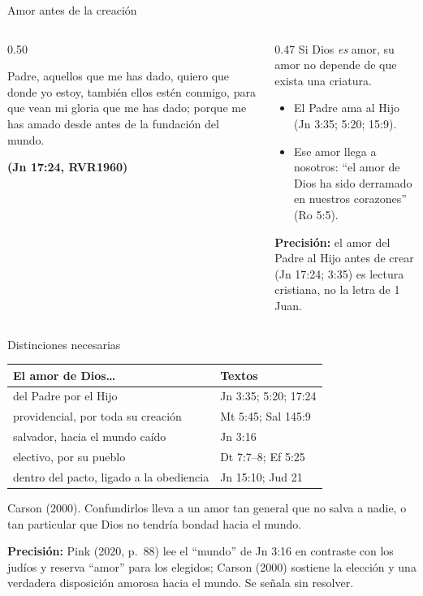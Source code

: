 \documentclass[hyperref={bookmarks=false},aspectratio=169]{beamer}
\newcommand{\fuente}[1]{\par\hfill{\upshape\bfseries\footnotesize\textcolor{azul}{#1}}}
\newcommand{\precision}[1]{{\footnotesize\color{gris}\textbf{Precisión:} #1}}
\begin{document}
\begin{frame}{Amor antes de la creación}
\begin{columns}[c,onlytextwidth]
\begin{column}{0.50\textwidth}
\begin{cita}Padre, aquellos que me has dado, quiero que donde yo estoy, también ellos estén conmigo, para que vean mi gloria que me has dado; porque me has amado desde antes de la fundación del mundo.\fuente{(Jn 17:24, RVR1960)}\end{cita}
\end{column}
\begin{column}{0.47\textwidth}\small
Si Dios \emph{es} amor, su amor no depende de que exista una criatura.
\begin{itemize}
\item El Padre ama al Hijo (Jn 3:35; 5:20; 15:9).
\item Ese amor llega a nosotros: ``el amor de Dios ha sido derramado en nuestros corazones'' (Ro 5:5).
\end{itemize}
\precision{el amor del Padre al Hijo antes de crear (Jn 17:24; 3:35) es lectura cristiana, no la letra de 1 Juan.}
\end{column}
\end{columns}
\end{frame}

\begin{frame}{Distinciones necesarias}
\small\renewcommand{\arraystretch}{1.18}
\begin{tabular}{@{}>{\RaggedRight\arraybackslash}p{5.4cm}>{\RaggedRight\arraybackslash}p{6.4cm}@{}}
\toprule
\textbf{El amor de Dios\ldots} & \textbf{Textos} \\ \midrule
del Padre por el Hijo & Jn 3:35; 5:20; 17:24 \\
providencial, por toda su creación & Mt 5:45; Sal 145:9 \\
salvador, hacia el mundo caído & Jn 3:16 \\
electivo, por su pueblo & Dt 7:7--8; Ef 5:25 \\
dentro del pacto, ligado a la obediencia & Jn 15:10; Jud 21 \\
\bottomrule
\end{tabular}\par\smallskip
\scriptsize Carson (2000). Confundirlos lleva a un amor tan general que no salva a nadie, o tan particular que Dios no tendría bondad hacia el mundo.\par
\precision{Pink (2020, p.~88) lee el ``mundo'' de Jn 3:16 en contraste con los judíos y reserva ``amor'' para los elegidos; Carson (2000) sostiene la elección y una verdadera disposición amorosa hacia el mundo. Se señala sin resolver.}
\end{frame}
\end{document}
